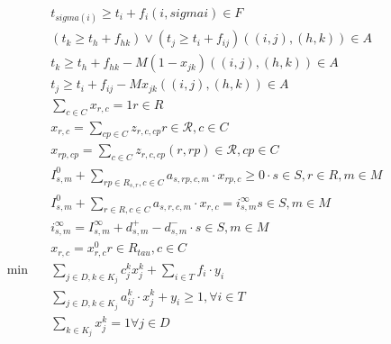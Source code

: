 \begin{align}
  & t_{\mathit{sigma} \left(i\right)} \geq t_{i} + f_{i} \left(i , \mathit{sigma} i\right) \in F \tag{eq\_0002} \\
  & \left(t_{k} \geq t_{h} + f_{\mathit{hk}}\right) \vee \left(t_{j} \geq t_{i} + f_{\mathit{ij}}\right) \left(\left(i , j\right) , \left(h , k\right)\right) \in A \tag{eq\_0003} \\
  & t_{k} \geq t_{h} + f_{\mathit{hk}} - M \left(1 - x_{\mathit{jk}}\right) \left(\left(i , j\right) , \left(h , k\right)\right) \in A \tag{eq\_0004} \\
  & t_{j} \geq t_{i} + f_{\mathit{ij}} - \mathit{Mx}_{\mathit{jk}} \left(\left(i , j\right) , \left(h , k\right)\right) \in A \tag{eq\_0005} \\
  & \sum_{c \in C} x_{r , c} = 1 r \in R \tag{eq\_0007} \\
  & x_{r , c} = \sum_{cp \in C} z_{r , c , cp} r \in \mathcal{R} , c \in C \tag{eq\_0008} \\
  & x_{rp , cp} = \sum_{c \in C} z_{r , c , cp} \left(r , rp\right) \in \mathcal{R} , cp \in C \tag{eq\_0009} \\
  & I_{s , m}^{0} + \sum_{rp \in R_{s , r}, c \in C} a_{s , rp , c , m} \cdot x_{rp , c} \geq 0 \cdot s \in S , r \in R , m \in M \tag{eq\_0010} \\
  & I_{s , m}^{0} + \sum_{r \in R, c \in C} a_{s , r , c , m} \cdot x_{r , c} = i_{s , m}^{\infty} s \in S , m \in M \tag{eq\_0011} \\
  & i_{s , m}^{\infty} = I_{s , m}^{\infty} + d_{s , m}^{+} - d_{s , m}^{-} \cdot s \in S , m \in M \tag{eq\_0012} \\
  & x_{r , c} = x_{r , c}^{0} r \in R_{\mathit{tau}} , c \in C \tag{eq\_0013} \\
  \min\quad & \sum_{j \in D, k \in K_{j}} c_{j}^{k} x_{j}^{k} + \sum_{i \in T} f_{i} \cdot y_{i} \tag{eq\_0015} \\
  & \sum_{j \in D, k \in K_{j}} a_{\mathit{ij}}^{k} \cdot x_{j}^{k} + y_{i} \geq 1 , \forall i \in T \tag{eq\_0016} \\
  & \sum_{k \in K_{j}} x_{j}^{k} = 1 \forall j \in D \tag{eq\_0017} \\
\end{align}
